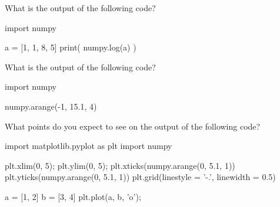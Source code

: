 \documentclass[../main.tex]{subfiles}
\begin{document}
\begin{example}
  What is the output of the following code?
  \begin{pythoncode}
import numpy

a = [1, 1, 8, 5]
print( numpy.log(a) )
  \end{pythoncode}
\end{example}

\begin{example}
  What is the output of the following code?

  \begin{pythoncode}
import numpy

numpy.arange(-1, 15.1, 4)
  \end{pythoncode}
\end{example}

\begin{example}
  What points do you expect to see on the output of the following code?

  \begin{pythoncode}
import matplotlib.pyplot as plt
import numpy

plt.xlim(0, 5);
plt.ylim(0, 5);
plt.xticks(numpy.arange(0, 5.1, 1))
plt.yticks(numpy.arange(0, 5.1, 1))
plt.grid(linestyle = '-.', linewidth = 0.5)

a = [1, 2]
b = [3, 4]
plt.plot(a, b, 'o');
  \end{pythoncode}
\end{example}
\end{document}
